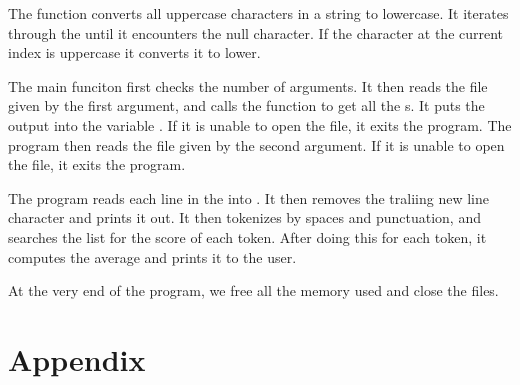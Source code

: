 \documentclass{article}
\theoremstyle{mytheoremstyle}
\theoremstyle{mytheoremstyle}
\theoremstyle{myproblemstyle}
\begin{document}
    The  function converts all uppercase characters in a string to lowercase. It iterates through the  until it encounters the null character. If the character at the current index is uppercase it converts it to lower.

    The main funciton first checks the number of arguments. It then reads the file given by the first argument, and calls the  function to get all the s. It puts the output into the variable . If it is unable to open the file, it exits the program. The program then reads the file given by the second argument. If it is unable to open the file, it exits the program.

    The program reads each line in the  into . It then removes the traliing new line character and prints it out. It then tokenizes  by spaces and punctuation, and searches the  list for the score of each token. After doing this for each token, it computes the average and prints it to the user.

    At the very end of the program, we free all the memory used and close the files.

    \section{Appendix}
    
\end{document}
